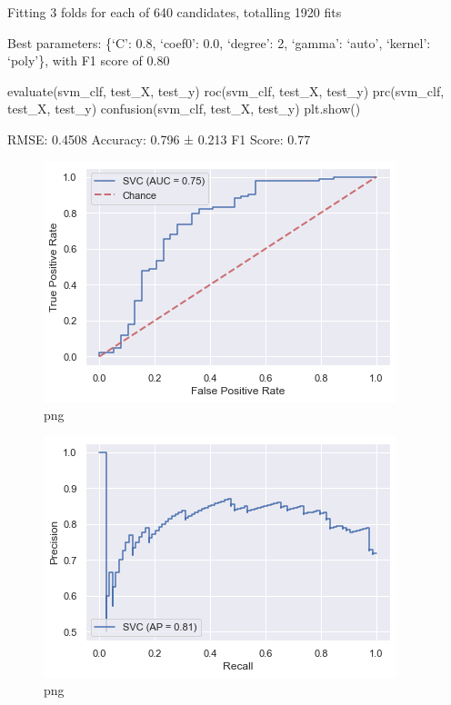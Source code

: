 \documentclass[]{article}
\newenvironment{Shaded}{}{}
\newcommand{\NormalTok}[1]{#1}
\begin{document}
Fitting 3 folds for each of 640 candidates, totalling 1920 fits

Best parameters: \{`C': 0.8, `coef0': 0.0, `degree': 2, `gamma': `auto',
`kernel': `poly'\}, with F1 score of 0.80

\begin{Shaded}
\begin{Highlighting}[]
\NormalTok{evaluate(svm_clf, test_X, test_y)}
\NormalTok{roc(svm_clf, test_X, test_y)}
\NormalTok{prc(svm_clf, test_X, test_y)}
\NormalTok{confusion(svm_clf, test_X, test_y)}
\NormalTok{plt.show()}
\end{Highlighting}
\end{Shaded}

RMSE: 0.4508 Accuracy: 0.796 ± 0.213 F1 Score: 0.77

\begin{figure}
\centering
\includegraphics{notebook_files/notebook_52_1.png}
\caption{png}
\end{figure}

\begin{figure}
\centering
\includegraphics{notebook_files/notebook_52_2.png}
\caption{png}
\end{figure}
\end{document}
